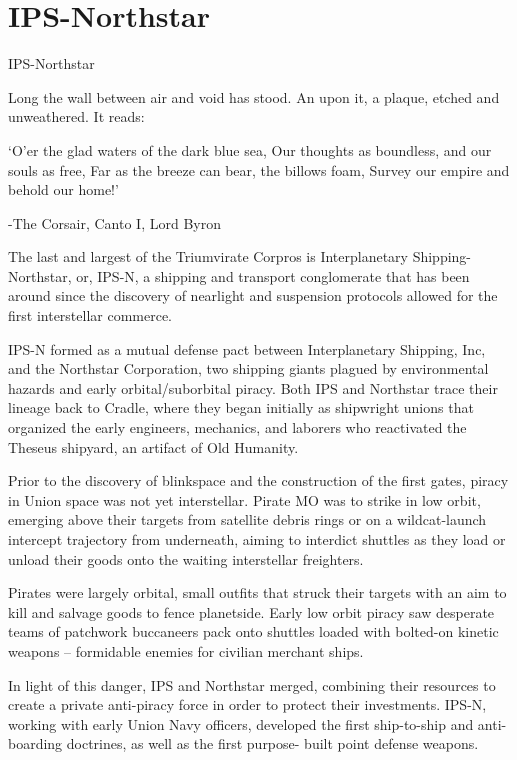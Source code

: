 \section{IPS-Northstar}

IPS-Northstar

                 Long the wall between air and void has stood. An upon it, a plaque, etched
                 and unweathered. It reads:

                         ‘O’er the glad waters of the dark blue sea,
                         Our thoughts as boundless, and our souls as free,
                         Far as the breeze can bear, the billows foam,
                         Survey our empire and behold our home!’

                                 -The Corsair, Canto I, Lord Byron

The last and largest of the Triumvirate Corpros is Interplanetary Shipping-Northstar, or, IPS-N, a
shipping and transport conglomerate that has been around since the discovery of nearlight and
suspension protocols allowed for the first interstellar commerce.

IPS-N formed as a mutual defense pact between Interplanetary Shipping, Inc, and the Northstar
Corporation, two shipping giants plagued by environmental hazards and early orbital/suborbital
piracy. Both IPS and Northstar trace their lineage back to Cradle, where they began initially as
shipwright unions that organized the early engineers, mechanics, and laborers who reactivated
the Theseus shipyard, an artifact of Old Humanity.

Prior to the discovery of blinkspace and the construction of the first gates, piracy in Union space
was not yet interstellar. Pirate MO was to strike in low orbit, emerging above their targets from
satellite debris rings or on a wildcat-launch intercept trajectory from underneath, aiming to interdict
shuttles as they load or unload their goods onto the waiting interstellar freighters.

Pirates were largely orbital, small outfits that struck their targets with an aim to kill and salvage
goods to fence planetside. Early low orbit piracy saw desperate teams of patchwork buccaneers
pack onto shuttles loaded with bolted-on kinetic weapons -- formidable enemies for civilian
merchant ships.

In light of this danger, IPS and Northstar merged, combining their resources to create a private
anti-piracy force in order to protect their investments. IPS-N, working with early Union Navy
officers, developed the first ship-to-ship and anti-boarding doctrines, as well as the first purpose-
built point defense weapons.

